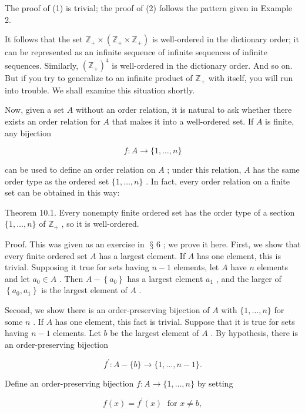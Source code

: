 \documentclass[10pt]{article}
\begin{document}
The proof of (1) is trivial; the proof of (2) follows the pattern given in Example 2.

It follows that the set \({\mathbb{Z}}_{ + } \times  \left( {{\mathbb{Z}}_{ + } \times  {\mathbb{Z}}_{ + }}\right)\) is well-ordered in the dictionary order; it can be represented as an infinite sequence of infinite sequences of infinite sequences. Similarly, \({\left( {\mathbb{Z}}_{ + }\right) }^{4}\) is well-ordered in the dictionary order. And so on. But if you try to generalize to an infinite product of \({\mathbb{Z}}_{ + }\) with itself, you will run into trouble. We shall examine this situation shortly.

Now, given a set \(A\) without an order relation, it is natural to ask whether there exists an order relation for \(A\) that makes it into a well-ordered set. If \(A\) is finite, any bijection

\[
f : A \rightarrow  \{ 1,\ldots ,n\}
\]

can be used to define an order relation on \(A\) ; under this relation, \(A\) has the same order type as the ordered set \(\{ 1,\ldots ,n\}\) . In fact, every order relation on a finite set can be obtained in this way:

Theorem 10.1. Every nonempty finite ordered set has the order type of a section \(\{ 1,\ldots ,n\}\) of \({\mathbb{Z}}_{ + }\) , so it is well-ordered.

Proof. This was given as an exercise in \(\text{ § }6\) ; we prove it here. First, we show that every finite ordered set \(A\) has a largest element. If \(A\) has one element, this is trivial. Supposing it true for sets having \(n - 1\) elements, let \(A\) have \(n\) elements and let \({a}_{0} \in  A\) . Then \(A - \left\{  {a}_{0}\right\}\) has a largest element \({a}_{1}\) , and the larger of \(\left\{  {{a}_{0},{a}_{1}}\right\}\) is the largest element of \(A\) .

Second, we show there is an order-preserving bijection of \(A\) with \(\{ 1,\ldots ,n\}\) for some \(n\) . If \(A\) has one element, this fact is trivial. Suppose that it is true for sets having \(n - 1\) elements. Let \(b\) be the largest element of \(A\) . By hypothesis, there is an order-preserving bijection

\[
{f}^{\prime } : A - \{ b\}  \rightarrow  \{ 1,\ldots ,n - 1\} .
\]

Define an order-preserving bijection \(f : A \rightarrow  \{ 1,\ldots ,n\}\) by setting

\[
f\left( x\right)  = {f}^{\prime }\left( x\right) \;\text{ for }x \neq  b,
\]
\end{document}
